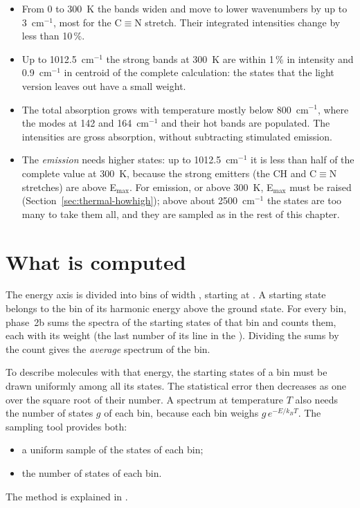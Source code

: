 \begin{itemize}
\item From 0 to 300~K the bands widen and move to lower wavenumbers by
up to 3~cm$^{-1}$, most for the C$\equiv$N stretch. Their integrated
intensities change by less than 10\,\%.
\item Up to 1012.5~cm$^{-1}$ the strong bands at 300~K are within 1\,\%
in intensity and 0.9~cm$^{-1}$ in centroid of the complete calculation:
the states that the light version leaves out have a small weight.
\item The total absorption grows with temperature mostly below
800~cm$^{-1}$, where the modes at 142 and 164~cm$^{-1}$ and their hot
bands are populated. The intensities are gross absorption, without
subtracting stimulated emission.
\item The \emph{emission} needs higher states: up to 1012.5~cm$^{-1}$ it
is less than half of the complete value at 300~K, because the strong
emitters (the CH and C$\equiv$N stretches) are above E$_\mathrm{max}$.
For emission, or above 300~K, E$_\mathrm{max}$ must be raised
(Section~\ref{sec:thermal-howhigh}); above about 2500~cm$^{-1}$ the states
are too many to take them all, and they are sampled as in the rest of
this chapter.
\end{itemize}

\section{What is computed}\label{sec:thermal-what}

The energy axis is divided into bins of width , starting at
. A starting state belongs to the bin of its harmonic
energy above the ground state. For every bin, phase~2b sums the spectra of
the starting states of that bin and counts them, each with its weight (the
last number of its line in the ). Dividing the sums by
the count gives the \emph{average} spectrum of the bin.

To describe molecules with that energy, the starting states of a bin must
be drawn uniformly among all its states. The statistical error then
decreases as one over the square root of their number. A spectrum at
temperature $T$ also needs the number of states $g$ of each bin, because
each bin weighs $g\,e^{-E/k_BT}$. The sampling tool provides both:
\begin{itemize}
\item a uniform sample of the states of each bin;
\item the number of states of each bin.
\end{itemize}
The method is explained in .

